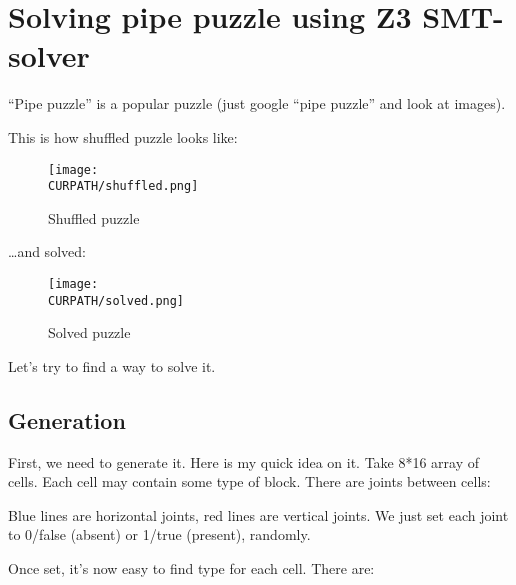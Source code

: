 \section{Solving pipe puzzle using Z3 SMT-solver}

\renewcommand{\CURPATH}{puzzles/pipe}

``Pipe puzzle'' is a popular puzzle (just google ``pipe puzzle'' and look at images).

This is how shuffled puzzle looks like:

\begin{figure}[H]
\label{fig:pipe_shuffled}
\centering
\texttt{[image: \\CURPATH/shuffled.png]}
\caption{Shuffled puzzle}
\end{figure}

\dots and solved:

\begin{figure}[H]
\label{fig:pipe_solved}
\centering
\texttt{[image: \\CURPATH/solved.png]}
\caption{Solved puzzle}
\end{figure}

Let's try to find a way to solve it.

\subsection{Generation}

First, we need to generate it.
Here is my quick idea on it.
Take 8*16 array of cells.
Each cell may contain some type of block.
There are joints between cells:



Blue lines are horizontal joints, red lines are vertical joints.
We just set each joint to 0/false (absent) or 1/true (present), randomly.

Once set, it's now easy to find type for each cell.
There are:

